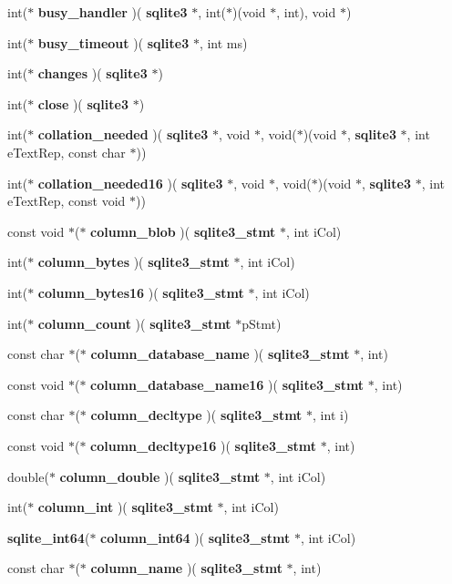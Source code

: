 \begin{DoxyCompactItemize}
int($\ast$ \textbf{ busy\+\_\+handler} )(\textbf{ sqlite3} $\ast$, int($\ast$)(void $\ast$, int), void $\ast$)
\item 
int($\ast$ \textbf{ busy\+\_\+timeout} )(\textbf{ sqlite3} $\ast$, int ms)
\item 
int($\ast$ \textbf{ changes} )(\textbf{ sqlite3} $\ast$)
\item 
int($\ast$ \textbf{ close} )(\textbf{ sqlite3} $\ast$)
\item 
int($\ast$ \textbf{ collation\+\_\+needed} )(\textbf{ sqlite3} $\ast$, void $\ast$, void($\ast$)(void $\ast$, \textbf{ sqlite3} $\ast$, int e\+Text\+Rep, const char $\ast$))
\item 
int($\ast$ \textbf{ collation\+\_\+needed16} )(\textbf{ sqlite3} $\ast$, void $\ast$, void($\ast$)(void $\ast$, \textbf{ sqlite3} $\ast$, int e\+Text\+Rep, const void $\ast$))
\item 
const void $\ast$($\ast$ \textbf{ column\+\_\+blob} )(\textbf{ sqlite3\+\_\+stmt} $\ast$, int i\+Col)
\item 
int($\ast$ \textbf{ column\+\_\+bytes} )(\textbf{ sqlite3\+\_\+stmt} $\ast$, int i\+Col)
\item 
int($\ast$ \textbf{ column\+\_\+bytes16} )(\textbf{ sqlite3\+\_\+stmt} $\ast$, int i\+Col)
\item 
int($\ast$ \textbf{ column\+\_\+count} )(\textbf{ sqlite3\+\_\+stmt} $\ast$p\+Stmt)
\item 
const char $\ast$($\ast$ \textbf{ column\+\_\+database\+\_\+name} )(\textbf{ sqlite3\+\_\+stmt} $\ast$, int)
\item 
const void $\ast$($\ast$ \textbf{ column\+\_\+database\+\_\+name16} )(\textbf{ sqlite3\+\_\+stmt} $\ast$, int)
\item 
const char $\ast$($\ast$ \textbf{ column\+\_\+decltype} )(\textbf{ sqlite3\+\_\+stmt} $\ast$, int i)
\item 
const void $\ast$($\ast$ \textbf{ column\+\_\+decltype16} )(\textbf{ sqlite3\+\_\+stmt} $\ast$, int)
\item 
double($\ast$ \textbf{ column\+\_\+double} )(\textbf{ sqlite3\+\_\+stmt} $\ast$, int i\+Col)
\item 
int($\ast$ \textbf{ column\+\_\+int} )(\textbf{ sqlite3\+\_\+stmt} $\ast$, int i\+Col)
\item 
\textbf{ sqlite\+\_\+int64}($\ast$ \textbf{ column\+\_\+int64} )(\textbf{ sqlite3\+\_\+stmt} $\ast$, int i\+Col)
\item 
const char $\ast$($\ast$ \textbf{ column\+\_\+name} )(\textbf{ sqlite3\+\_\+stmt} $\ast$, int)

\end{DoxyCompactItemize}
